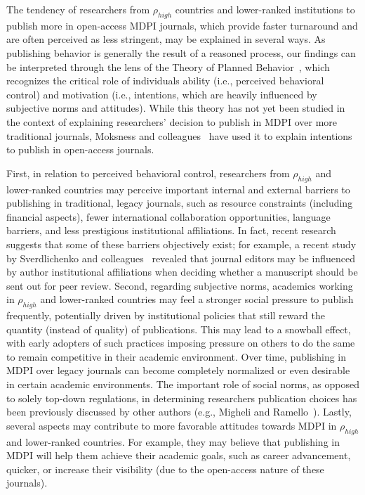 \documentclass[amsfonts, amssymb, prl, superscriptaddress, notitlepage, twocolumn, nofootinbib]{revtex4-2}
\begin{document}
The tendency of researchers from $\rho_{high}$ countries and lower-ranked institutions to publish more in open-access MDPI journals, which provide faster turnaround and are often perceived as less stringent, may be explained in several ways. As publishing behavior is generally the result of a reasoned process, our findings can be interpreted through the lens of the Theory of Planned Behavior~\cite{ajzen1991}, which recognizes the critical role of individuals ability (i.e., perceived behavioral control) and motivation (i.e., intentions, which are heavily influenced by subjective norms and attitudes). While this theory has not yet been studied in the context of explaining researchers’ decision to publish in MDPI over more traditional journals, Moksness and colleagues~\cite{moksness2020} have used it to explain intentions to publish in open-access journals.

First, in relation to perceived behavioral control, researchers from $\rho_{high}$ and lower-ranked countries may perceive important internal and external barriers to publishing in traditional, legacy journals, such as resource constraints (including financial aspects), fewer international collaboration opportunities, language barriers, and less prestigious institutional affiliations. In fact, recent research suggests that some of these barriers objectively exist; for example, a recent study by Sverdlichenko and colleagues~\cite{sverdlichenko2022} revealed that journal editors may be influenced by author institutional affiliations when deciding whether a manuscript should be sent out for peer review. Second, regarding subjective norms, academics working in $\rho_{high}$ and lower-ranked countries may feel a stronger social pressure to publish frequently, potentially driven by institutional policies that still reward the quantity (instead of quality) of publications. This may lead to a snowball effect, with early adopters of such practices imposing pressure on others to do the same to remain competitive in their academic environment. Over time, publishing in MDPI over legacy journals can become completely normalized or even desirable in certain academic environments. The important role of social norms, as opposed to solely top-down regulations, in determining researchers publication choices has been previously discussed by other authors (e.g., Migheli and Ramello~\cite{migheli2013}). Lastly, several aspects may contribute to more favorable attitudes towards MDPI in $\rho_{high}$ and lower-ranked countries. For example, they may believe that publishing in MDPI will help them achieve their academic goals, such as career advancement, quicker, or increase their visibility (due to the open-access nature of these journals).
\end{document}
